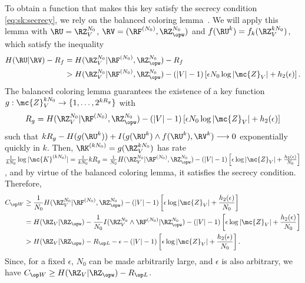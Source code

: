 To obtain a function that makes this key satisfy the secrecy condition \eqref{eq:sk:secrecy}, we rely on the 
balanced coloring lemma~\cite[Lemma~B.3]{csiszar04}. We will apply this lemma  with $\RU=\RZ_V^{N_0}$, $\RV=(\RF^{(N_0)}, \RZ^{N_0}_{\opw})$ and $f(\RU^k)= f_k(\RZ_V^{kN_0})$, which satisfy the inequality 
\begin{align*}
    H(\RU|\RV)-R_f&=H(\RZ_V^{N_0}|\RF^{(N_0)}, \RZ^{N_0}_{\opw})-R_f \\
&> H(\RZ_V^{N_0}|\RF^{(N_0)}, \RZ^{N_0}_{\opw})-(|V|-1)\left[\epsilon N_0 \log|\mc{Z}_V|+h_2(\epsilon)\right].
\end{align*}
The balanced coloring lemma guarantees the existence of a key function $g:\mc{Z}_V^{kN_0} \to \{1, \ldots, 2^{kR_g}\}$ with $$R_g= H(\RZ_V^{N_0}|\RF^{(N_0)}, \RZ^{N_0}_{\opw})-(|V|-1)\left[\epsilon N_0 \log|\mc{Z}_V|+h_2(\epsilon)\right]$$ such that  $kR_g-H(g(\RU^k))+I(g(\RU^k) \wedge f(\RU^k), \RV^k) \longrightarrow 0$ exponentially quickly in $k$. Then, $\RK^{(kN_0)}=g(\RZ_V^{kN_0})$ has rate  $\frac{1}{kN_0}\log|\mc{K}^{(kN_0)}|=\frac{1}{kN_0}kR_g= \frac{1}{N_0} H(\RZ_V^{N_0}|\RF^{(N_0)}, \RZ^{N_0}_{\opw})-(|V|-1)\left[\epsilon \log|\mc{Z}_V|+\frac{h_2(\epsilon)}{N_0}\right]$, and by virtue of the balanced coloring lemma, it satisfies the secrecy condition. Therefore,
\begin{align*}
    \wskc &\geq \frac{1}{N_0} H(\RZ_V^{N_0}|\RF^{(N_0)}, \RZ^{N_0}_{\opw})-(|V|-1)\left[\epsilon \log|\mc{Z}_V|+\frac{h_2(\epsilon)}{N_0}\right]\\
    & = H(\RZ_V| \RZ_{\opw})- \frac{1}{N_0}I(\RZ_V^{N_0}\wedge \RF^{(N_0)}| \RZ^{N_0}_{\opw})-(|V|-1)\left[\epsilon \log|\mc{Z}_V|+\frac{h_2(\epsilon)}{N_0}\right]\\
    & >H(\RZ_V| \RZ_{\opw})- \rl -\epsilon-(|V|-1)\left[\epsilon \log|\mc{Z}_V|+\frac{h_2(\epsilon)}{N_0}\right].
\end{align*}
Since, for a fixed $\epsilon$, $N_0$ can be made arbitrarily large, and $\epsilon$ is also arbitrary, we have $\wskc \geq H(\RZ_V| \RZ_{\opw})- \rl$.